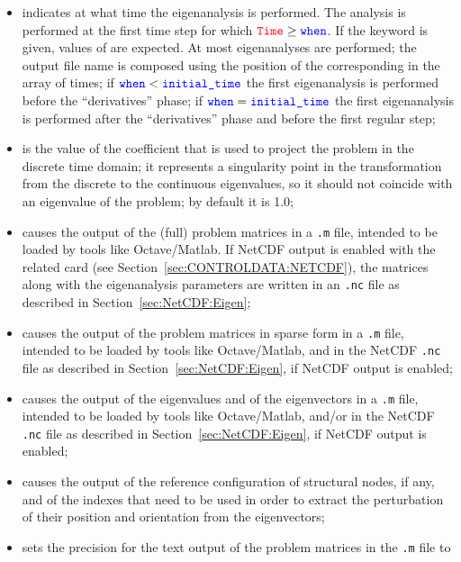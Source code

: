 \begin{itemize}
\item {} indicates at what time the eigenanalysis is performed.
	The analysis is performed at the first time step for which
	$\textcolor{red}{\texttt{Time}} \ge \textcolor{blue}{\texttt{when}}$.
	If the keyword  is given,  values
	of  are expected.  At most  eigenanalyses
	are performed; the output file name is composed using
	the position of the corresponding  in the array
	of times;
	if $\textcolor{blue}{\texttt{when}} < \textcolor{blue}{\texttt{initial\_time}}$ the first eigenanalysis
	is performed before the ``derivatives'' phase;
	if $\textcolor{blue}{\texttt{when}} = \textcolor{blue}{\texttt{initial\_time}}$ the first eigenanalysis
	is performed after the ``derivatives'' phase
	and before the first regular step;
\item {} is the value of the coefficient that is used to project
	the problem in the discrete time domain; it represents
	a singularity point in the transformation from the discrete
	to the continuous eigenvalues, so it should not coincide with
	an eigenvalue of the problem;  by default it is 1.0;
\item {} causes the output
	of the (full) problem matrices in a \texttt{.m} file,
	intended to be loaded by tools like Octave/Matlab. If
	NetCDF output is enabled with the related 
	card (see Section~\ref{sec:CONTROLDATA:NETCDF}), 
	the matrices along with the eigenanalysis parameters 
	are written in an \texttt{.nc} file as described in 
	Section~\ref{sec:NetCDF:Eigen};
\item {} causes the output
	of the problem matrices in sparse form in a \texttt{.m} file,
	intended to be loaded by tools like Octave/Matlab, and in the
	NetCDF \texttt{.nc} file as described in 
	Section~\ref{sec:NetCDF:Eigen}, if NetCDF output is enabled;
\item {} causes the output of the eigenvalues
	and of the eigenvectors in a \texttt{.m} file,
	intended to be loaded by tools like Octave/Matlab, and/or in the
	NetCDF \texttt{.nc} file as described in 
	Section~\ref{sec:NetCDF:Eigen}, if NetCDF output is enabled;
\item {} causes the output of the reference
	configuration of structural nodes, if any,
	and of the indexes that need to be used in order to extract
	the perturbation of their position and orientation
	from the eigenvectors;
\item {} sets the precision for the text output
  	of the problem matrices in the \texttt{.m} file to 

\end{itemize}
